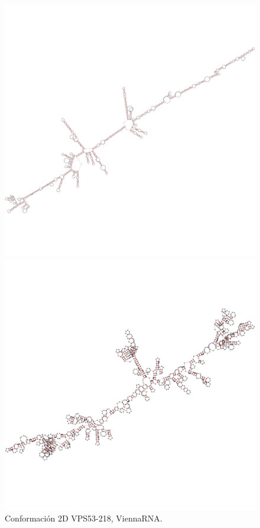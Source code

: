 \documentclass[a4paper,11pt,titlepage]{article}
\theoremstyle{definition}
\begin{document}
\begin{figure}[H]
    \centering
    \begin{minipage}[c]{0.31\textwidth}
        \centering
        \includegraphics[width=\textwidth]{images/VPS53-218-db_vrna.png}
        \caption{Conformación 2D VPS53-218, ViennaRNA.}
        \label{fig:VPS53-218-vrna}
    \end{minipage}
    \hfill
    \begin{minipage}[c]{0.31\textwidth}
        \centering
        \includegraphics[width=\textwidth]{images/VPS53-218-db_rndc.png}

\end{minipage}
\end{figure}
\end{document}
